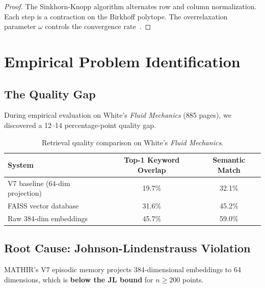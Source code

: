 \documentclass[12pt,a4paper]{article}
\theoremstyle{definition}
\theoremstyle{remark}
\begin{document}
\begin{proof}
The Sinkhorn-Knopp algorithm alternates row and column normalization. Each step is a contraction on the Birkhoff polytope. The overrelaxation parameter $\omega$ controls the convergence rate~\cite{sinkhorn1964}.
\end{proof}

\section{Empirical Problem Identification}
\label{sec:problem}

\subsection{The Quality Gap}

During empirical evaluation on White's \textit{Fluid Mechanics} (885 pages), we discovered a 12--14 percentage-point quality gap.

\begin{table}[H]
\centering
\caption{Retrieval quality comparison on White's \textit{Fluid Mechanics}.}
\label{tab:gap}
\begin{tabular}{lcc}
\toprule
\textbf{System} & \textbf{Top-1 Keyword Overlap} & \textbf{Semantic Match} \\
\midrule
V7 baseline (64-dim projection) & 19.7\% & 32.1\% \\
FAISS vector database & 31.6\% & 45.2\% \\
Raw 384-dim embeddings & 45.7\% & 59.0\% \\
\bottomrule
\end{tabular}
\end{table}

\subsection{Root Cause: Johnson-Lindenstrauss Violation}

MATHIR's V7 episodic memory projects 384-dimensional embeddings to 64 dimensions, which is \textbf{below the JL bound} for $n \ge 200$ points.
\end{document}
